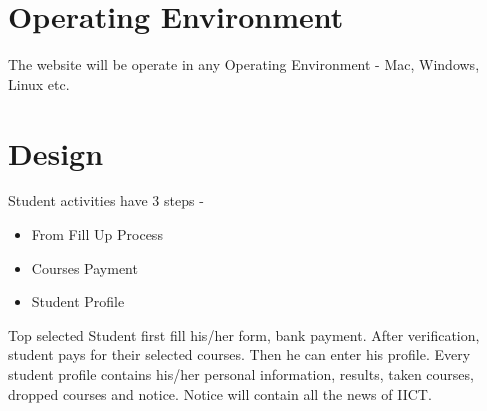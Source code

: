 \documentclass{scrreprt}
\begin{document}
\section{Operating Environment}
The website will be operate in any Operating Environment - Mac, Windows, Linux etc. 

\section{Design}
Student activities have 3 steps -
\begin{itemize}
    \item From Fill Up Process
    \item Courses Payment
    \item Student Profile
\end{itemize}
Top selected Student first fill his/her form, bank payment. After verification, student pays for their selected courses. Then he can enter his profile. 
\newline
Every student profile contains his/her personal information, results, taken courses, dropped courses and notice.
\newline
Notice will contain all the news of IICT.
\end{document}
